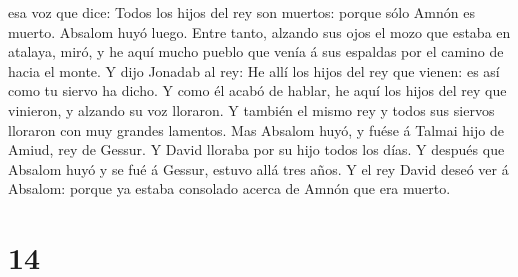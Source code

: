 esa voz que dice: Todos los hijos del rey son muertos: porque sólo Amnón
es muerto.  Absalom huyó luego. Entre tanto, alzando sus
ojos el mozo que estaba en atalaya, miró, y he aquí mucho pueblo que
venía á sus espaldas por el camino de hacia el monte.  Y
dijo Jonadab al rey: He allí los hijos del rey que vienen: es así como
tu siervo ha dicho.  Y como él acabó de hablar, he aquí
los hijos del rey que vinieron, y alzando su voz lloraron. Y también el
mismo rey y todos sus siervos lloraron con muy grandes lamentos.
 Mas Absalom huyó, y fuése á Talmai hijo de Amiud, rey de
Gessur. Y David lloraba por su hijo todos los días.  Y
después que Absalom huyó y se fué á Gessur, estuvo allá tres años.
 Y el rey David deseó ver á Absalom: porque ya estaba
consolado acerca de Amnón que era muerto.

\hypertarget{section-13}{%
\section{14}\label{section-13}}

